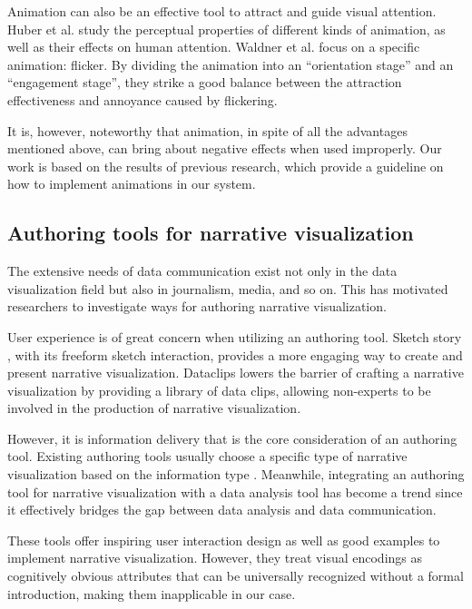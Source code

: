 Animation can also be an effective tool to attract and guide visual attention. Huber et al. \cite{huber_visualizing_2005} study the perceptual properties of different kinds of animation, as well as their effects on human attention. Waldner et al. \cite{waldner_attractive_2014} focus on a specific animation: flicker. By dividing the animation into an “orientation stage” and an “engagement stage”, they strike a good balance between the attraction effectiveness and annoyance caused by flickering. 

It is, however, noteworthy that animation, in spite of all the advantages mentioned above, can bring about negative effects when used improperly\cite{robertson_effectiveness_2008}. Our work is based on the results of previous research, which provide a guideline on how to implement animations in our system.

\subsection{Authoring tools for narrative visualization}
The extensive needs of data communication exist not only in the data visualization field but also in journalism, media, and so on. This has motivated researchers to investigate ways for authoring narrative visualization. 

User experience is of great concern when utilizing an authoring tool. Sketch story \cite{lee_sketchstory:_2013}, with its freeform sketch interaction, provides a more engaging way to create and present narrative visualization. Dataclips \cite{amini_authoring_2017} lowers the barrier of crafting a narrative visualization by providing a library of data clips, allowing non-experts to be involved in the production of narrative visualization. 

However, it is information delivery that is the core consideration of an authoring tool. Existing authoring tools usually choose a specific type of narrative visualization based on the information type \cite{amini_authoring_2017, fulda_timelinecurator:_2016}. Meanwhile, integrating an authoring tool for narrative visualization with a  data analysis tool has become a trend since it effectively bridges the gap between data analysis and data communication\cite{eccles_stories_2007, bryan_temporal_2016,lee_more_2015}. 
 
These tools offer inspiring user interaction design as well as good examples to implement narrative visualization. However, they treat visual encodings as cognitively obvious attributes that can be universally recognized without a formal introduction, making them inapplicable in our case. 

